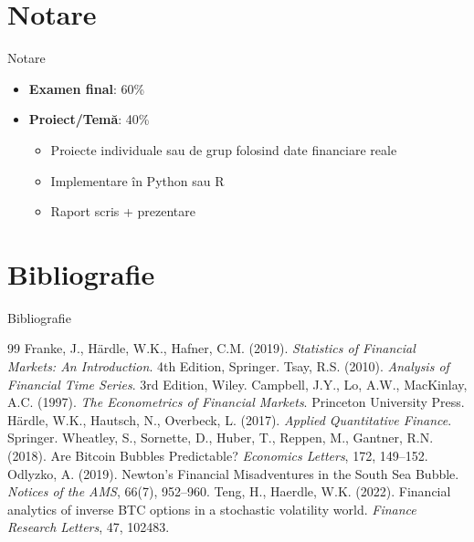\documentclass[9pt, aspectratio=169, t]{beamer}
\theoremstyle{definition}
\begin{document}
\section{Notare}

\begin{frame}{Notare}
\begin{itemize}
    \item \textbf{Examen final}: 60\%
    \item \textbf{Proiect/Temă}: 40\%
    \begin{itemize}
        \item Proiecte individuale sau de grup folosind date financiare reale
        \item Implementare în Python sau R
        \item Raport scris + prezentare
    \end{itemize}
\end{itemize}
\end{frame}

\section{Bibliografie}

\begin{frame}{Bibliografie}
{\small
\begin{thebibliography}{99}
 Franke, J., H\"{a}rdle, W.K., Hafner, C.M. (2019). \textit{Statistics of Financial Markets: An Introduction}. 4th Edition, Springer.
 Tsay, R.S. (2010). \textit{Analysis of Financial Time Series}. 3rd Edition, Wiley.
 Campbell, J.Y., Lo, A.W., MacKinlay, A.C. (1997). \textit{The Econometrics of Financial Markets}. Princeton University Press.
 H\"{a}rdle, W.K., Hautsch, N., Overbeck, L. (2017). \textit{Applied Quantitative Finance}. Springer.
 Wheatley, S., Sornette, D., Huber, T., Reppen, M., Gantner, R.N. (2018). Are Bitcoin Bubbles Predictable? \textit{Economics Letters}, 172, 149--152.
 Odlyzko, A. (2019). Newton's Financial Misadventures in the South Sea Bubble. \textit{Notices of the AMS}, 66(7), 952--960.
 Teng, H., Haerdle, W.K. (2022). Financial analytics of inverse BTC options in a stochastic volatility world. \textit{Finance Research Letters}, 47, 102483.
\end{thebibliography}
}
\end{frame}
\end{document}
